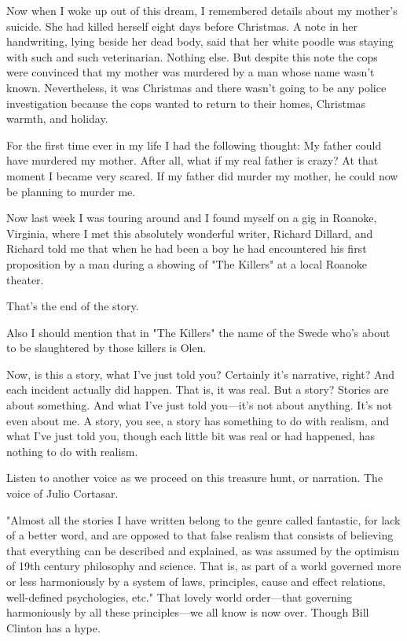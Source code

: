 Now when I woke up out of this dream, I remembered details about my
mother's suicide. She had killed herself eight days before Christmas. A
note in her handwriting, lying beside her dead body, said that her white
poodle was staying with such and such veterinarian. Nothing else. But
despite this note the cops were convinced that my mother was murdered by
a man whose name wasn't known. Nevertheless, it was Christmas and there
wasn't going to be any police investigation because the cops wanted to
return to their homes, Christmas warmth, and holiday.

For the first time ever in my life I had the following thought: My
father could have murdered my mother. After all, what if my real father
is crazy? At that moment I became very scared. If my father did murder
my mother, he could now be planning to murder me.

Now last week I was touring around and I found myself on a gig in
Roanoke, Virginia, where I met this absolutely wonderful writer, Richard
Dillard, and Richard told me that when he had been a boy he had
encountered his first proposition by a man during a showing of "The
Killers" at a local Roanoke theater.

That's the end of the story.

Also I should mention that in "The Killers" the name of the Swede who's
about to be slaughtered by those killers is Olen.

Now, is this a story, what I've just told you? Certainly it's narrative,
right? And each incident actually did happen. That is, it was real. But
a story? Stories are about something. And what I've just told you---it's
not about anything. It's not even about me. A story, you see, a story
has something to do with realism, and what I've just told you, though
each little bit was real or had happened, has nothing to do with
realism.

Listen to another voice as we proceed on this treasure hunt, or
narration. The voice of Julio Cortasar.

"Almost all the stories I have written belong to the genre called
fantastic, for lack of a better word, and are opposed to that false
realism that consists of believing that everything can be described and
explained, as was assumed by the optimism of 19th century philosophy and
science. That is, as part of a world governed more or less harmoniously
by a system of laws, principles, cause and effect relations,
well-defined psychologies, etc." That lovely world order---that
governing harmoniously by all these principles---we all know is now
over. Though Bill Clinton has a hype.

